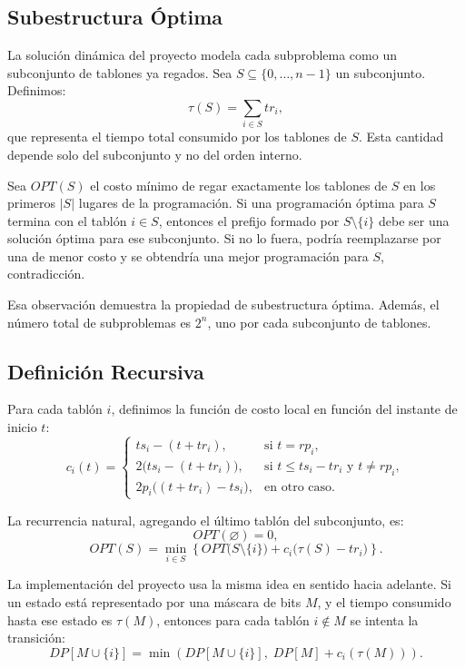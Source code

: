 \documentclass[12pt,a4paper]{article}
\newcommand{\cost}[1]{c_{#1}}
\begin{document}
\subsection{Subestructura \'Optima}

La soluci\'on din\'amica del proyecto modela cada subproblema como un subconjunto de tablones ya regados. Sea \(S \subseteq \{0,\dots,n-1\}\) un subconjunto. Definimos:
\[
\tau(S) = \sum_{i \in S} tr_i,
\]
que representa el tiempo total consumido por los tablones de \(S\). Esta cantidad depende solo del subconjunto y no del orden interno.

Sea \(OPT(S)\) el costo m\'inimo de regar exactamente los tablones de \(S\) en los primeros \(|S|\) lugares de la programaci\'on. Si una programaci\'on \'optima para \(S\) termina con el tabl\'on \(i \in S\), entonces el prefijo formado por \(S \setminus \{i\}\) debe ser una soluci\'on \'optima para ese subconjunto. Si no lo fuera, podr\'ia reemplazarse por una de menor costo y se obtendr\'ia una mejor programaci\'on para \(S\), contradicci\'on.

Esa observaci\'on demuestra la propiedad de subestructura \'optima. Adem\'as, el n\'umero total de subproblemas es \(2^n\), uno por cada subconjunto de tablones.

\subsection{Definici\'on Recursiva}

Para cada tabl\'on \(i\), definimos la funci\'on de costo local en funci\'on del instante de inicio \(t\):
\[
\cost{i}(t)=
\begin{cases}
ts_i - (t + tr_i), & \text{si } t = rp_i, \\[4pt]
2\bigl(ts_i - (t + tr_i)\bigr), & \text{si } t \leq ts_i - tr_i \text{ y } t \neq rp_i, \\[4pt]
2p_i\bigl((t + tr_i) - ts_i\bigr), & \text{en otro caso.}
\end{cases}
\]

La recurrencia natural, agregando el \'ultimo tabl\'on del subconjunto, es:
\[
OPT(\varnothing)=0,
\]
\[
OPT(S)=\min_{i\in S}\left\{ OPT\bigl(S\setminus\{i\}\bigr) + \cost{i}\bigl(\tau(S)-tr_i\bigr) \right\}.
\]

La implementaci\'on del proyecto usa la misma idea en sentido hacia adelante. Si un estado est\'a representado por una m\'ascara de bits \(M\), y el tiempo consumido hasta ese estado es \(\tau(M)\), entonces para cada tabl\'on \(i \notin M\) se intenta la transici\'on:
\[
DP[M \cup \{i\}] =
\min\left(DP[M \cup \{i\}],\; DP[M] + \cost{i}(\tau(M))\right).
\]
\end{document}
